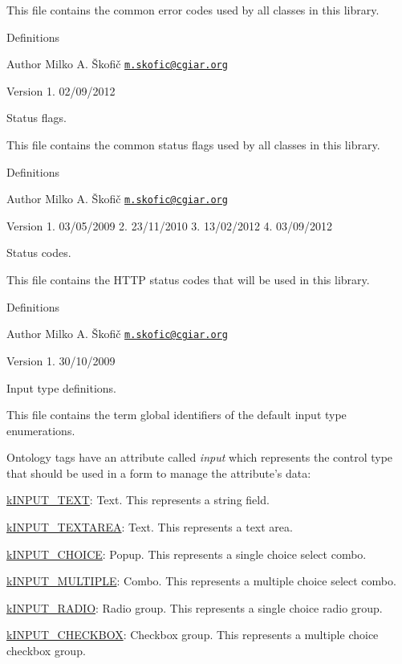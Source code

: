 This file contains the common error codes used by all classes in this library.

Definitions

\begin{DoxyAuthor}{Author}
Milko A. Škofič \href{mailto:m.skofic@cgiar.org}{\tt m.\-skofic@cgiar.\-org} 
\end{DoxyAuthor}
\begin{DoxyVersion}{Version}
1. 02/09/2012
\end{DoxyVersion}
Status flags.

This file contains the common status flags used by all classes in this library.

Definitions

\begin{DoxyAuthor}{Author}
Milko A. Škofič \href{mailto:m.skofic@cgiar.org}{\tt m.\-skofic@cgiar.\-org} 
\end{DoxyAuthor}
\begin{DoxyVersion}{Version}
1. 03/05/2009 2. 23/11/2010 3. 13/02/2012 4. 03/09/2012
\end{DoxyVersion}
Status codes.

This file contains the H\-T\-T\-P status codes that will be used in this library.

Definitions

\begin{DoxyAuthor}{Author}
Milko A. Škofič \href{mailto:m.skofic@cgiar.org}{\tt m.\-skofic@cgiar.\-org} 
\end{DoxyAuthor}
\begin{DoxyVersion}{Version}
1. 30/10/2009
\end{DoxyVersion}
Input type definitions.

This file contains the term global identifiers of the default input type enumerations.

Ontology tags have an attribute called {\itshape input} which represents the control type that should be used in a form to manage the attribute's data\-:


\begin{DoxyItemize}
\item {\ttfamily \hyperlink{}{k\-I\-N\-P\-U\-T\-\_\-\-T\-E\-X\-T}}\-: Text. This represents a string field. 
\item {\ttfamily \hyperlink{}{k\-I\-N\-P\-U\-T\-\_\-\-T\-E\-X\-T\-A\-R\-E\-A}}\-: Text. This represents a text area. 
\item {\ttfamily \hyperlink{}{k\-I\-N\-P\-U\-T\-\_\-\-C\-H\-O\-I\-C\-E}}\-: Popup. This represents a single choice select combo. 
\item {\ttfamily \hyperlink{}{k\-I\-N\-P\-U\-T\-\_\-\-M\-U\-L\-T\-I\-P\-L\-E}}\-: Combo. This represents a multiple choice select combo. 
\item {\ttfamily \hyperlink{}{k\-I\-N\-P\-U\-T\-\_\-\-R\-A\-D\-I\-O}}\-: Radio group. This represents a single choice radio group. 
\item {\ttfamily \hyperlink{}{k\-I\-N\-P\-U\-T\-\_\-\-C\-H\-E\-C\-K\-B\-O\-X}}\-: Checkbox group. This represents a multiple choice checkbox group. 
\end{DoxyItemize}

